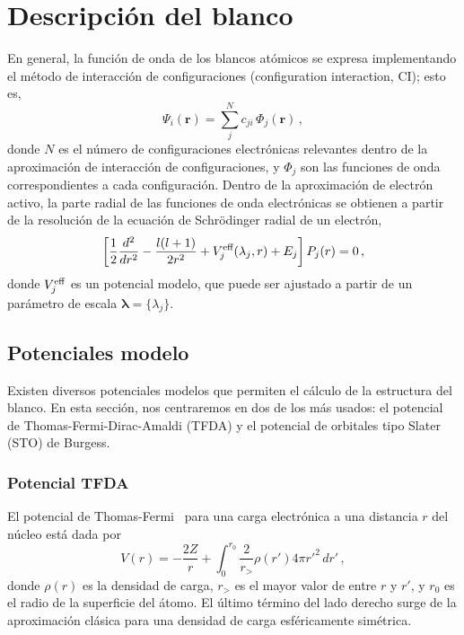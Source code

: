 \newpage
\section{Descripción del blanco}

En general, la función de onda de los blancos atómicos se expresa 
implementando el método de interacción de configuraciones (configuration
interaction, CI); esto es,
\begin{equation*}
\Psi_i(\mathbf{r}) =
\sum_j^{N} c_{ji} \, \Phi_j(\mathbf{r})\,,
\end{equation*}
donde $N$ es el número de configuraciones electrónicas relevantes dentro
de la aproximación de interacción de configuraciones, y $\Phi_j$ son las
funciones de onda correspondientes a cada configuración. Dentro de la 
aproximación de electrón activo, la parte radial de las funciones de 
onda electrónicas se obtienen a partir de la resolución de la ecuación 
de Schr\"odinger radial de un electrón,
\begin{equation*}
\left[ \frac{1}{2} \frac{d^2}{dr^2} - \frac{l(l+1)}{2r^2} 
 + V_j^{\mbox{\scriptsize eff}}(\lambda_j,r)
 + E_j \right] P_j(r)=0\,,
\end{equation*}
donde $V_j^{\mbox{\scriptsize eff}}$ es un potencial modelo, que puede 
ser ajustado a partir de un parámetro de escala 
$\boldsymbol\lambda=\{\lambda_j\}$. 


\subsection{Potenciales modelo}

Existen diversos potenciales modelos que permiten el cálculo de la
estructura del blanco. En esta sección, nos centraremos en dos de los más 
usados: el potencial de Thomas-Fermi-Dirac-Amaldi (TFDA) y el potencial 
de orbitales tipo Slater (STO) de Burgess.

\subsubsection*{Potencial TFDA}

El potencial de Thomas-Fermi~\cite{Gombas:56,Eissner:69,Bautista:08} para 
una carga electrónica a una distancia $r$ del núcleo está dada por
\begin{equation}
V(r)=-\frac{2Z}{r}+\int_0^{r_0}\frac{2}{r_>} \rho(r')4\pi r'^2\,dr'\,,
\label{eq:Thomas-Fermi}
\end{equation}
donde $\rho(r)$ es la densidad de carga, $r_>$ es el mayor valor de entre
$r$ y $r'$, y $r_0$ es el radio de la superficie del átomo. El último
término del lado derecho surge de la aproximación clásica para una 
densidad de carga esféricamente simétrica. 

